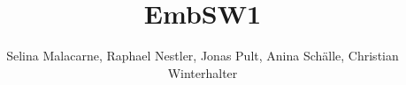 \documentclass[titlepage=true]{scrartcl}
\title{EmbSW1}
\author{Selina Malacarne, Raphael Nestler, Jonas Pult, Anina Schälle, Christian Winterhalter}
\begin{document}
\begin{titlepage}
   \thispagestyle{empty}
   \maketitle
\end{titlepage}

\tableofcontents \newpage













\end{document}
